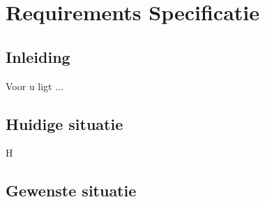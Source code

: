 
\chapter{Requirements Specificatie}\label{ch:requirements-specificatie}


\section{Inleiding}\label{sec:RS_inleiding}
Voor u ligt ...
\lipsum[01]

\lipsum[02]

\section{Huidige situatie}
H

\section{Gewenste situatie}
